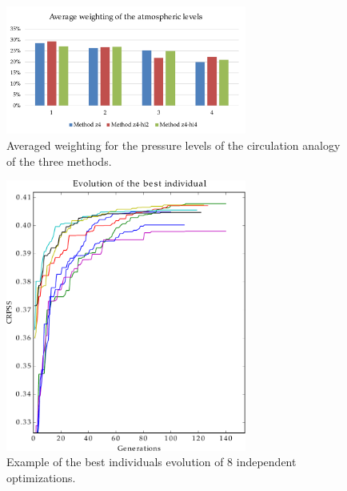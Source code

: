 \documentclass{ametsoc}
\begin{document}
\begin{figure}[htb]
	\centerline{\includegraphics[width=7.9cm]{figures/figure_levels_weights_average.pdf}}
	\caption{Averaged weighting for the pressure levels of the circulation analogy of the three methods.}
	\label{fig:levels_weights_average}
\end{figure}

\begin{figure}[htb]
	\centerline{\includegraphics[width=7.9cm]{figures/figure_evolution.pdf}}
	\caption{Example of the best individuals evolution of 8 independent optimizations.}
	\label{fig:evolution}
\end{figure}
\end{document}
